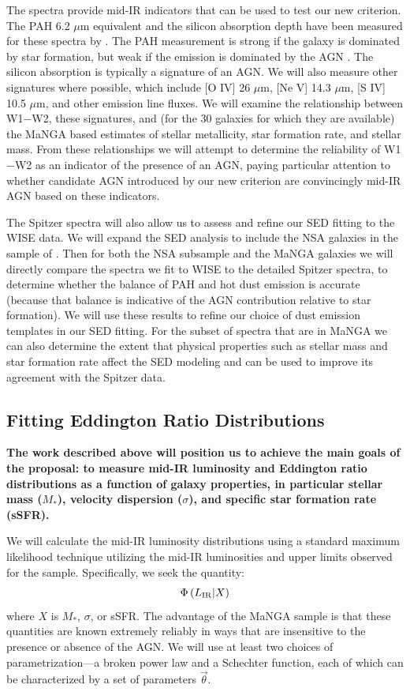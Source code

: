 \documentclass[12pt, preprint]{hacked-aastex}
\begin{document}
The spectra provide mid-IR indicators that can be used to test our new
criterion.  The PAH 6.2 $\mu$m equivalent and the silicon absorption
depth have been measured for these spectra by \cite{lambrides19a}.  The
PAH measurement is strong if the galaxy is dominated by star
formation, but weak if the emission is dominated by the AGN
\cite{sajina22a}.  The silicon absorption is typically a signature of
an AGN.  We will also measure other signatures where possible, which
include [O IV] 26 $\mu$m, [Ne V] 14.3 $\mu$m, [S IV] 10.5 $\mu$m, and
other emission line fluxes.  We will examine the relationship between
W1$-$W2, these signatures, and (for the 30 galaxies for which they are
available) the MaNGA based estimates of stellar metallicity, star
formation rate, and stellar mass. From these relationships we will
attempt to determine the reliability of W1$-$W2 as an indicator of the
presence of an AGN, paying particular attention to whether candidate
AGN introduced by our new criterion are convincingly mid-IR AGN based
on these indicators.

The Spitzer spectra will also allow us to assess and refine our SED
fitting to the WISE data. We will expand the SED analysis to include
the NSA galaxies in the sample of \cite{lambrides19a}.  Then for both
the NSA subsample and the MaNGA galaxies we will directly compare the
spectra we fit to WISE to the detailed Spitzer spectra, to determine
whether the balance of PAH and hot dust emission is accurate (because
that balance is indicative of the AGN contribution relative to star
formation). We will use these results to refine our choice of dust
emission templates in our SED fitting. For the subset of spectra that
are in MaNGA we can also determine the extent that physical properties
such as stellar mass and star formation rate affect the SED modeling
and can be used to improve its agreement with the Spitzer data.

\subsection{Fitting Eddington Ratio Distributions}
\label{sec:erd}

{\bf The work described above will position us to achieve the main
  goals of the proposal: to measure mid-IR luminosity and Eddington
  ratio distributions as a function of galaxy properties, in
  particular stellar mass ($M_\ast$), velocity dispersion ($\sigma$),
  and specific star formation rate (sSFR).}

We will calculate the mid-IR luminosity distributions using a standard
maximum likelihood technique utilizing the mid-IR luminosities and
upper limits observed for the sample. Specifically, we seek the
quantity:
\begin{equation}
\Phi\left(L_{\rm IR} | X\right)
\end{equation}
where $X$ is $M_\ast$, $\sigma$, or sSFR. The advantage of the MaNGA
sample is that these quantities are known extremely reliably in ways
that are insensitive to the presence or absence of the AGN. We will
use at least two choices of parametrization---a broken power law and a
Schechter function, each of which can be characterized by a set of
parameters $\vec{\theta}$.
\end{document}
